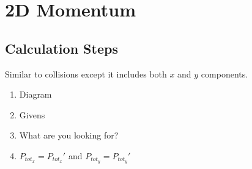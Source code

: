 \documentclass{article}
\begin{document}
\section{2D Momentum}
\begin{adjustwidth}{1cm}{0pt}
    \subsection*{Calculation Steps}
    \begin{flushleft}
        Similar to collisions except it includes both $x$ and $y$ components.
    \end{flushleft}
    \vspace*{5pt}
    \begin{adjustwidth}{0.5cm}{0pt}
        \begin{enumerate}
            \item Diagram
            \item Givens
            \item What are you looking for?
            \item $P_{tot_{x}} = P_{tot_{x}}\prime$ and $P_{tot_{y}} = P_{tot_{y}}\prime$
        \end{enumerate}
    \end{adjustwidth}
\end{adjustwidth}
\end{document}
